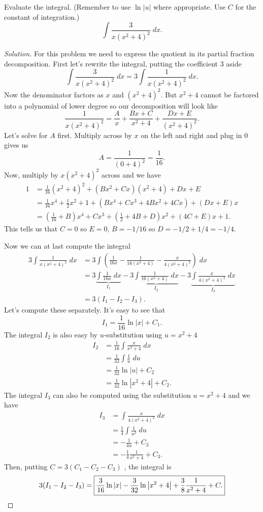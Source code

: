 \begin{problem}[WebAssign, HW 14, \# 3]
Evaluate the integral. (Remember to use $\ln|u|$ where appropriate. Use $C$
for the constant of integration.)
\[
\int\frac{3}{x(x^2+4)^2}\;dx.
\]
\end{problem}
\begin{proof}[Solution]
For this problem  we need to express the quotient in its partial fraction
decomposition. First let's rewrite the integral, putting the coefficient $3$
aside
\[
\int\frac{3}{x(x^2+4)^2}\;dx=
3\int\frac{1}{x(x^2+4)^2}\;dx.
\]
Now the denominator factors as $x$ and $(x^2+4)^2$. But $x^2+4$ cannot be
factored into a polynomial of lower degree so our decomposition will look
like
\[
\frac{1}{x(x^2+4)^2}=
\frac{A}{x}+\frac{Bx+C}{x^2+4}+\frac{Dx+E}{(x^2+4)^2}.
\]
Let's solve for $A$ first. Multiply across by $x$ on the left and right and
plug in $0$ gives us
\[
A=\frac{1}{(0+4)^2}=\frac{1}{16}.
\]
Now, multiply by $x(x^2+4)^2$ across and we have
\begin{align*}
1&=\frac{1}{16}(x^2+4)^2+(Bx^2+Cx)(x^2+4)+Dx+E\\
&=\frac{1}{16}x^4+\frac{1}{2}x^2+1+\left(Bx^4+Cx^3+4Bx^2+4Cx\right)+(Dx+E)x\\
&=\left(\frac{1}{16}+B\right)x^4+Cx^3
+\left(\frac{1}{2}+4B+D\right)x^2+\left(4C+E\right)x+1.
\end{align*}
This tells us that $C=0$ so $E=0$, $B=-1/16$ so $D=-1/2+1/4=-1/4$.

Now we can at last compute the integral
\begin{align*}
3\int\frac{1}{x(x^2+4)^2}\;dx
&=3\int\left(\frac{1}{16x}-\frac{1}{16(x^2+4)}
-\frac{x}{4(x^2+4)^2}\right)\;dx\\
&=3\underbrace{\int\frac{1}{16x}\;dx}_{I_1}
-3\underbrace{\int\frac{1}{16(x^2+4)}\;dx}_{I_2}
-3\underbrace{\int\frac{x}{4(x^2+4)^2}\;dx}_{I_3}\\
&=3(I_1-I_2-I_3).
\end{align*}
Let's compute these separately. It's easy to see that
\[
I_1=\frac{1}{16}\ln|x|+C_1.
\]
The integral $I_2$ is also easy by $u$-substitution using $u=x^2+4$
\begin{align*}
I_2&=\frac{1}{16}\int\frac{x}{x^2+4}\;dx\\
   &=\frac{1}{32}\int\frac{1}{u}\;du\\
   &=\frac{1}{32}\ln|u|+C_2\\
   &=\frac{1}{32}\ln\left|x^2+4\right|+C_2.
\end{align*}
The integral $I_3$ can also be computed using the substitution $u=x^2+4$
and we have
\begin{align*}
I_3&=\int\frac{x}{4(x^2+4)^2}\;dx\\
&=\frac{1}{4}\int\frac{1}{u^2}\;du\\
&=-\frac{1}{4u}+C_3\\
&=-\frac{1}{4}\frac{1}{x^2+4}+C_3.
\end{align*}
Then, putting $C=3(C_1-C_2-C_3)$ , the integral is
\[
3(I_1-I_2-I_3)=\boxed{\frac{3}{16}\ln|x|-\frac{3}{32}\ln\left|x^2+4\right|
+\frac{3}{8}\frac{1}{x^2+4}+C.}\qedhere
\]
\end{proof}

